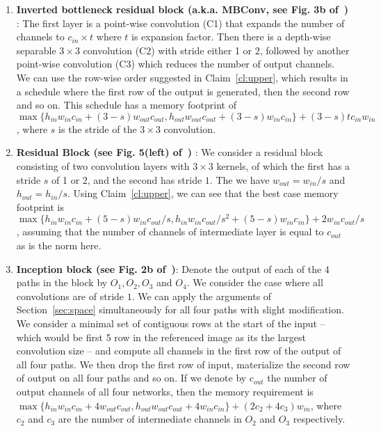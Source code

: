 \documentclass[10pt]{article}
\begin{document}
\begin{enumerate}[leftmargin=*]
  \item \textbf{Inverted bottleneck residual block (a.k.a. MBConv, see
    Fig. 3b of~\citep{sandler2018mobilenetv2})} : The first layer is a
    point-wise convolution (C1) that expands the number of channels to
    $c_{in} \times t$ where $t$ is expansion factor. Then there is a
    depth-wise separable $3 \times 3$ convolution (C2) with stride
    either 1 or 2, followed by another point-wise convolution (C3)
    which reduces the number of output channels.  We can use the
    row-wise order suggested in Claim~\ref{cl:upper}, which results in
    a schedule where the first row of the output is generated, then
    the second row and so on. This schedule has a memory footprint of
    $\max\{h_{in}w_{in}c_{in} + (3-s)w_{out}c_{out},
    h_{out}w_{out}c_{out} + (3-s)w_{in}c_{in}\} + (3-s)tc_{in}w_{in}
    $, where $s$ is the stride of the $3\times 3$ convolution.





  \item \textbf{Residual Block (see Fig. 5(left)
    of~\citep{he2016deep})} : We consider a residual block consisting
    of two convolution layers with $3\times 3$ kernels, of which the
    first has a stride $s$ of 1 or 2, and the second has stride $1$.
    The we have $w_{out} = w_{in}/s$ and $h_{out} = h_{in}/s$.  Using
    Claim~\ref{cl:upper}, we can see that the best case memory
    footprint is $\max\{h_{in}w_{in}c_{in} + (5-s)w_{in}c_{out}/s,
    h_{in}w_{in}c_{out}/s^2 + (5-s)w_{in}c_{in}\} + 2w_{in}c_{out}/s$,
    assuming that the number of channels of intermediate layer is
    equal to $c_{out}$ as is the norm here.



  \item \textbf{Inception block (see Fig. 2b
    of~\citep{szegedy2015going})}: Denote the output of each of the
    $4$ paths in the block by $O_1, O_2, O_3$ and $O_4$. We consider
    the case where all convolutions are of stride $1$. We can apply
    the arguments of Section~\ref{sec:space} simultaneously for all
    four paths with slight modification.  We consider a minimal set of
    contiguous rows at the start of the input -- which would be first
    5 row in the referenced image as its the largest convolution size
    -- and compute all channels in the first row of the output of all
    four paths.  We then drop the first row of input, materialize the
    second row of output on all four paths and so on. If we denote by
    $c_{out}$ the number of output channels of all four networks, then
    the memory requirement is $\max\{h_{in}w_{in}c_{in} + 4
    w_{out}c_{out}, h_{out}w_{out}c_{out} + 4w_{in}c_{in}\} + (2c_2 +
    4c_3)w_{in}$, where $c_2$ and $c_3$ are the number of intermediate
    channels in $O_2$ and $O_3$ respectively.




\end{enumerate}
\end{document}
